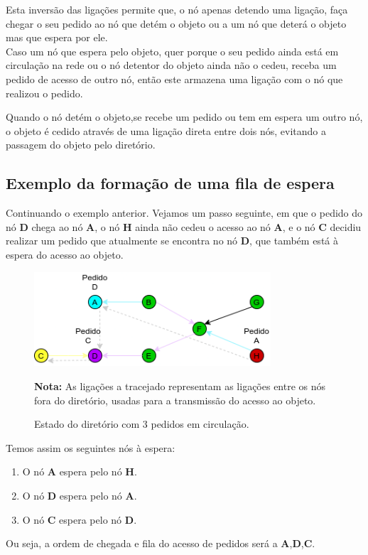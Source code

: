 Esta inversão das ligações permite que, o nó apenas detendo uma ligação, faça chegar o seu pedido ao nó que detém o objeto ou a um nó que deterá o objeto mas que espera por ele. \\




Caso um nó que espera pelo objeto, quer porque o seu pedido ainda está em circulação na rede ou o nó detentor do objeto ainda não o cedeu, receba um pedido de acesso de outro nó, então este armazena uma ligação com o nó que realizou o pedido.

Quando o nó detém o objeto,se recebe um pedido ou tem em espera um outro nó, o objeto é cedido através de uma ligação direta entre dois nós, evitando a passagem do objeto pelo diretório.


\subsection*{Exemplo da formação de uma fila de espera}

Continuando o exemplo anterior. Vejamos um passo seguinte, em que o pedido do nó \textbf{D} chega ao nó \textbf{A}, o nó \textbf{H} ainda não cedeu o acesso ao nó \textbf{A}, e o nó \textbf{C} decidiu realizar um pedido que atualmente se encontra no nó \textbf{D}, que também está à espera do acesso ao objeto. 

\begin{figure}[!htb]
\centering
\includegraphics[width=250pt]{fila.png}
\caption{Estado do diretório com 3 pedidos em circulação.}
\textbf{Nota:} As ligações a tracejado representam as ligações entre os nós fora do diretório, usadas para a transmissão do acesso ao objeto.
\end{figure}


Temos assim os seguintes nós à espera:
\begin{enumerate}
    \item O nó \textbf{A} espera pelo nó \textbf{H}.
    \item O nó \textbf{D} espera pelo nó \textbf{A}.
    \item O nó \textbf{C} espera pelo nó \textbf{D}.
\end{enumerate}
Ou seja, a ordem de chegada e fila do acesso de pedidos será a \textbf{A},\textbf{D},\textbf{C}. \\


